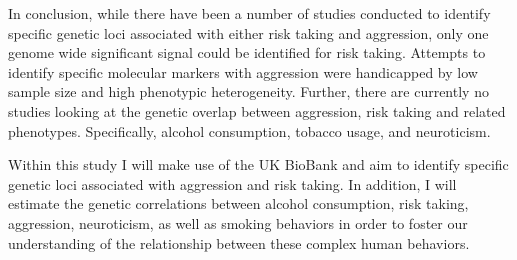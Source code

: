 In conclusion, while there have been a number of studies conducted to identify specific genetic loci associated  with either risk taking and aggression, only one genome wide significant signal could be identified for risk taking.
Attempts to identify specific molecular markers with aggression were handicapped by low sample size and high phenotypic heterogeneity.
Further, there are currently no studies looking at the genetic overlap between aggression, risk taking and related phenotypes.
Specifically, alcohol consumption, tobacco usage, and neuroticism.

Within this study I will make use of the UK BioBank and aim to identify specific genetic loci associated with aggression and risk taking.
In addition, I will estimate the genetic correlations between alcohol consumption, risk taking, aggression, neuroticism, as well as smoking behaviors in order to foster our understanding of the relationship between these complex human behaviors.

